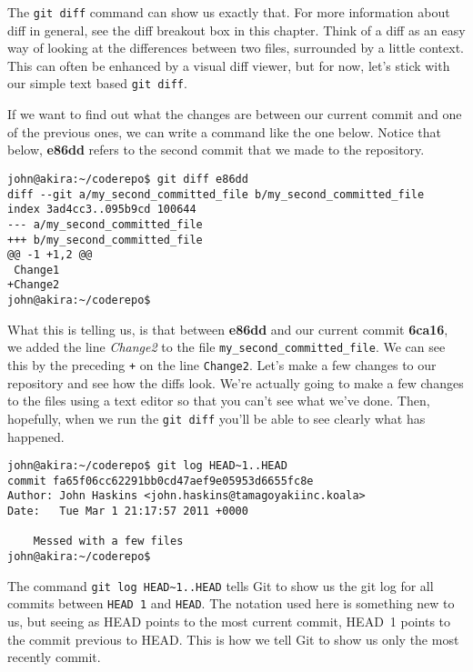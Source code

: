 The \texttt{git diff} command can show us exactly that.  For more information about diff in general, see the diff breakout box in this chapter.  Think of a diff as an easy way of looking at the differences between two files, surrounded by a little context.  This can often be enhanced by a visual diff viewer, but for now, let's stick with our simple text based \texttt{git diff}.  

If we want to find out what the changes are between our current commit and one of the previous ones, we can write a command like the one below.  Notice that below, \textbf{e86dd} refers to the second commit that we made to the repository.  

\begin{Verbatim}[frame=leftline,framerule=1mm,fontsize=\relsize{-3}] 
john@akira:~/coderepo$ git diff e86dd
diff --git a/my_second_committed_file b/my_second_committed_file
index 3ad4cc3..095b9cd 100644
--- a/my_second_committed_file
+++ b/my_second_committed_file
@@ -1 +1,2 @@
 Change1
+Change2
john@akira:~/coderepo$ 
\end{Verbatim}

What this is telling us, is that between \textbf{e86dd} and our current commit \textbf{6ca16}, we added the line \emph{Change2} to the file \texttt{my\_second\_committed\_file}.  We can see this by the preceding \texttt{+} on the line \texttt{Change2}.  Let's make a few changes to our repository and see how the diffs look.  We're actually going to make a few changes to the files using a text editor so that you can't see what we've done.  Then, hopefully, when we run the \texttt{git diff} you'll be able to see clearly what has happened.

\begin{Verbatim}[frame=leftline,framerule=1mm,fontsize=\relsize{-3}] 
john@akira:~/coderepo$ git log HEAD~1..HEAD
commit fa65f06cc62291bb0cd47aef9e05953d6655fc8e
Author: John Haskins <john.haskins@tamagoyakiinc.koala>
Date:   Tue Mar 1 21:17:57 2011 +0000

    Messed with a few files
john@akira:~/coderepo$ 
\end{Verbatim}

The command \texttt{git log HEAD\textasciitilde1..HEAD} tells Git to show us the git log for all commits between \texttt{HEAD~1} and \texttt{HEAD}.  The notation used here is something new to us, but seeing as HEAD points to the most current commit, HEAD~1 points to the commit previous to HEAD.  This is how we tell Git to show us only the most recently commit.  

